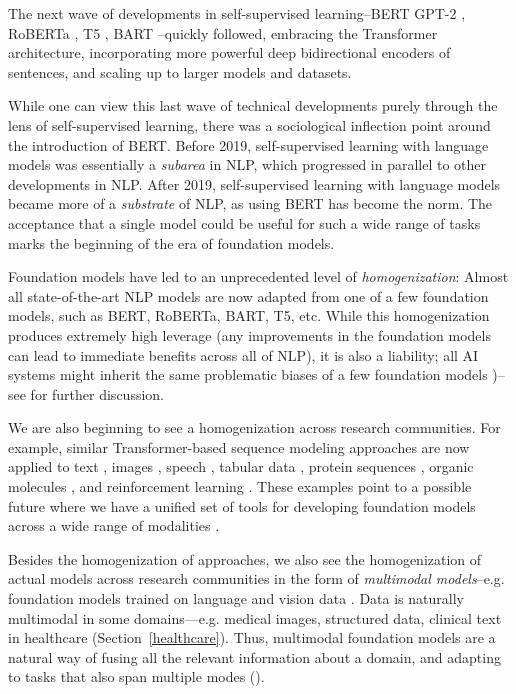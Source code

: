 The next wave of developments in self-supervised learning--BERT \citep{devlin2019bert} GPT-2 \citep{radford2019language}, RoBERTa \citep{liu2019roberta}, T5 \citep{raffel2019exploring}, BART \citep{lewis2020bart}--quickly followed, embracing the Transformer architecture, incorporating more powerful deep bidirectional encoders of sentences, and scaling up to larger models and datasets.

While one can view this last wave of technical developments purely through the lens of self-supervised learning, there was a sociological inflection point around the introduction of BERT. Before 2019, self-supervised learning with language models was essentially a \emph{subarea} in NLP, which progressed in parallel to other developments in NLP. After 2019, self-supervised learning with language models became more of a \emph{substrate} of NLP, as using BERT has become the norm. The acceptance that a single model could be useful for such a wide range of tasks marks the beginning of the era of foundation models.

Foundation models have led to an unprecedented level of \emph{homogenization}:
Almost all state-of-the-art NLP models are now adapted from one of a few foundation models, such as BERT, RoBERTa, BART, T5, etc. While this homogenization produces extremely high leverage (any improvements in the foundation models can lead to immediate benefits across all of NLP), it is also a liability; all AI systems might inherit the same problematic biases of a few foundation models \citep[][\textit{inter alia}]{bolukbasi2016, caliskan2017, abid2021})--see  for further discussion.

We are also beginning to see a homogenization across research communities. For example, similar Transformer-based sequence modeling approaches are now applied to text \citep{devlin2019bert, radford2019language, raffel2019exploring}, images \citep{visual_transformer, chen2020imagegpt}, speech \citep{Liu2020MockingjayUS}, tabular data \citep{Yin2020TaBERTPF}, protein sequences \citep{rives2021}, organic molecules \citep{rothchild2021c5t5}, and reinforcement learning \citep{Chen2021DecisionTR, Janner2021ReinforcementLA}. These examples point to a possible future where we have a unified set of tools for developing foundation models across a wide range of modalities \citep{Tamkin2021DABS}.

Besides the homogenization of approaches, we also see the homogenization of actual models across research communities in the form of \emph{multimodal models}--e.g. {}foundation models trained on language and vision data \citep{luo2020univl,kim2021vilt,cho2021unifying,ramesh2021zeroshot,radford2021learning}. Data is naturally multimodal in some domains---e.g. medical images, structured data, clinical text in healthcare (Section~\ref{healthcare}).
Thus, multimodal foundation models are a natural way of fusing all the relevant information about a domain, and adapting to tasks that also span multiple modes ().

